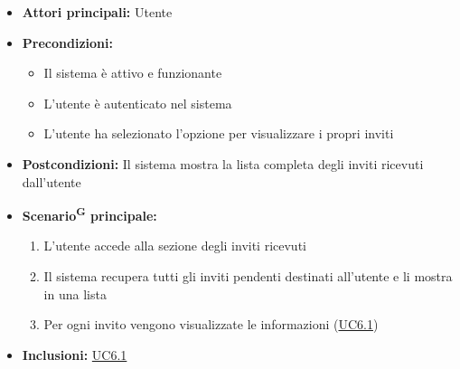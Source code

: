 \documentclass[a4paper, 11pt]{article}
\begin{document}
\begin{itemize}
	\item \textbf{Attori principali:} Utente
	\item \textbf{Precondizioni:}
	\begin{itemize}
		\item Il sistema è attivo e funzionante
		\item L'utente è autenticato nel sistema
        \item L'utente ha selezionato l'opzione per visualizzare i propri inviti
	\end{itemize}	\item \textbf{Postcondizioni:} Il sistema mostra la lista completa degli inviti ricevuti dall'utente

	\item \textbf{Scenario\textsuperscript{G} principale:}
	\begin{enumerate}
		\item L'utente accede alla sezione degli inviti ricevuti
		\item Il sistema recupera tutti gli inviti pendenti destinati all'utente e li mostra in una lista
		\item Per ogni invito vengono visualizzate le informazioni (\hyperref[UC6.1]{UC6.1})
	\end{enumerate}
    \item \textbf{Inclusioni:} \hyperref[UC6.1]{UC6.1}
\end{itemize}
\end{document}
